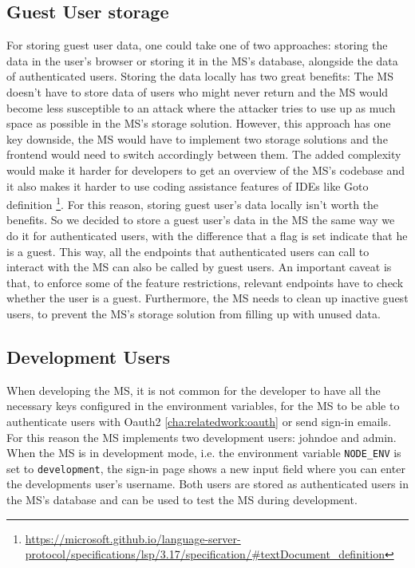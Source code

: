 \subsection{Guest User storage}

For storing guest user data, one could take one of two approaches:
storing the data in the user's browser or storing it in the MS's database, alongside the
data of authenticated users.
Storing the data locally has two great benefits: 
The MS doesn't have to store data of users who might never return and
the MS would become less susceptible to an attack where the attacker tries to use up as
much space as possible in the MS's storage solution.
However, this approach has one key downside, the MS would have to implement two storage
solutions and the frontend would need to switch accordingly between them.
The added complexity would make it harder for developers to get an overview of the MS's
codebase and it also makes it harder to use coding assistance features of IDEs like Goto
definition \footnote{\url{https://microsoft.github.io/language-server-protocol/specifications/lsp/3.17/specification/\#textDocument_definition}}.
For this reason, storing guest user's data locally isn't worth the benefits.
So we decided to store a guest user's data in the MS the same way we do it for
authenticated users,
with the difference that a flag is set 
indicate that he is a guest.
This way, all the endpoints that authenticated users can call to interact with the MS
can also be called by guest users.
An important caveat is that, to enforce some of the feature restrictions, relevant
endpoints have to check whether the user is a guest.
Furthermore, the MS needs to clean up inactive guest users, to prevent the MS's storage
solution from filling up with unused data.

\subsection{Development Users}

When developing the MS, it is not common for the developer to have all the necessary keys
configured in the environment variables, for the MS to be able to authenticate users with
Oauth2 \ref{cha:relatedwork:oauth} or send sign-in emails.
For this reason the MS implements two development users: johndoe and admin.
When the MS is in development mode, i.e. the environment variable \lstinline{NODE_ENV} is
set to \lstinline{development},
the sign-in page shows a new input field where you can enter the developments user's username.
Both users are stored as authenticated users in the MS's database and can be used to test
the MS during development.


